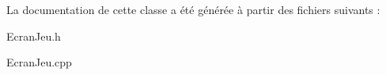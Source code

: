\-La documentation de cette classe a été générée à partir des fichiers suivants \-:\begin{DoxyCompactItemize}
\item 
\-Ecran\-Jeu.\-h\item 
\-Ecran\-Jeu.\-cpp\end{DoxyCompactItemize}
